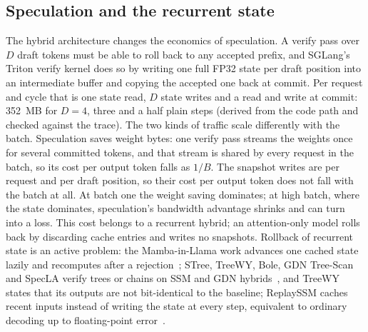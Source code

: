\subsection{Speculation and the recurrent state}\label{app:spec-state}\label{sec:stack-state}
The hybrid architecture changes the economics of speculation. A verify pass over $D$ draft tokens must be able to roll back to any accepted prefix, and SGLang's Triton verify kernel does so by writing one full FP32 state per draft position into an intermediate buffer and copying the accepted one back at commit. Per request and cycle that is one state read, $D$ state writes and a read and write at commit: 352~MB for $D=4$, three and a half plain steps (derived from the code path and checked against the trace). The two kinds of traffic scale differently with the batch. Speculation saves weight bytes: one verify pass streams the weights once for several committed tokens, and that stream is shared by every request in the batch, so its cost per output token falls as $1/B$. The snapshot writes are per request and per draft position, so their cost per output token does not fall with the batch at all. At batch one the weight saving dominates; at high batch, where the state dominates, speculation's bandwidth advantage shrinks and can turn into a loss. This cost belongs to a recurrent hybrid; an attention-only model rolls back by discarding cache entries and writes no snapshots. Rollback of recurrent state is an active problem: the Mamba-in-Llama work advances one cached state lazily and recomputes after a rejection~\cite{mambainllama}; STree, TreeWY, Bole, GDN Tree-Scan and SpecLA verify trees or chains on SSM and GDN hybrids~\cite{stree,treewy,bole,gdntreescan,specla}, and TreeWY states that its outputs are not bit-identical to the baseline; ReplaySSM caches recent inputs instead of writing the state at every step, equivalent to ordinary decoding up to floating-point error~\cite{replayssm}.


